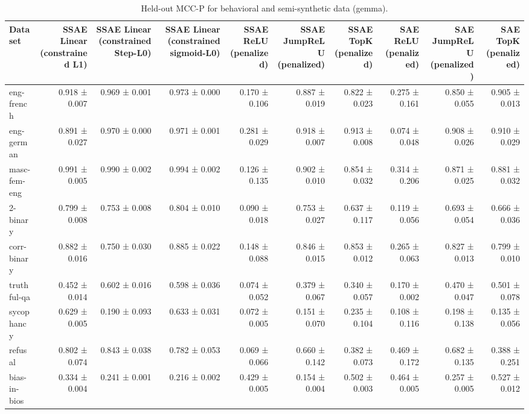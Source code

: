 \begin{table}[t]
\centering
\caption{Held-out MCC-P for behavioral and semi-synthetic data (gemma).}
\label{tab:all-datasets-gemma-mcc-p}
\begin{tabular}{lrrrrrrrrr}
\toprule
Dataset & SSAE Linear (constrained L1) & SSAE Linear (constrained Step-L0) & SSAE Linear (constrained sigmoid-L0) & SSAE ReLU (penalized) & SSAE JumpReLU (penalized) & SSAE TopK (penalized) & SAE ReLU (penalized) & SAE JumpReLU (penalized) & SAE TopK (penalized) \\
\midrule
eng-french & 0.918 ± 0.007 & 0.969 ± 0.001 & 0.973 ± 0.000 & 0.170 ± 0.106 & 0.887 ± 0.019 & 0.822 ± 0.023 & 0.275 ± 0.161 & 0.850 ± 0.055 & 0.905 ± 0.013 \\
eng-german & 0.891 ± 0.027 & 0.970 ± 0.000 & 0.971 ± 0.001 & 0.281 ± 0.029 & 0.918 ± 0.007 & 0.913 ± 0.008 & 0.074 ± 0.048 & 0.908 ± 0.026 & 0.910 ± 0.029 \\
masc-fem-eng & 0.991 ± 0.005 & 0.990 ± 0.002 & 0.994 ± 0.002 & 0.126 ± 0.135 & 0.902 ± 0.010 & 0.854 ± 0.032 & 0.314 ± 0.206 & 0.871 ± 0.025 & 0.881 ± 0.032 \\
2-binary & 0.799 ± 0.008 & 0.753 ± 0.008 & 0.804 ± 0.010 & 0.090 ± 0.018 & 0.753 ± 0.027 & 0.637 ± 0.117 & 0.119 ± 0.056 & 0.693 ± 0.054 & 0.666 ± 0.036 \\
corr-binary & 0.882 ± 0.016 & 0.750 ± 0.030 & 0.885 ± 0.022 & 0.148 ± 0.088 & 0.846 ± 0.015 & 0.853 ± 0.012 & 0.265 ± 0.063 & 0.827 ± 0.013 & 0.799 ± 0.010 \\
truthful-qa & 0.452 ± 0.014 & 0.602 ± 0.016 & 0.598 ± 0.036 & 0.074 ± 0.052 & 0.379 ± 0.067 & 0.340 ± 0.057 & 0.170 ± 0.002 & 0.470 ± 0.047 & 0.501 ± 0.078 \\
sycophancy & 0.629 ± 0.005 & 0.190 ± 0.093 & 0.633 ± 0.031 & 0.072 ± 0.005 & 0.151 ± 0.070 & 0.235 ± 0.104 & 0.108 ± 0.116 & 0.198 ± 0.138 & 0.135 ± 0.056 \\
refusal & 0.802 ± 0.074 & 0.843 ± 0.038 & 0.782 ± 0.053 & 0.069 ± 0.066 & 0.660 ± 0.142 & 0.382 ± 0.073 & 0.469 ± 0.172 & 0.682 ± 0.135 & 0.388 ± 0.251 \\
bias-in-bios & 0.334 ± 0.004 & 0.241 ± 0.001 & 0.216 ± 0.002 & 0.429 ± 0.005 & 0.154 ± 0.004 & 0.502 ± 0.003 & 0.464 ± 0.005 & 0.257 ± 0.005 & 0.527 ± 0.012 \\
\bottomrule
\end{tabular}
\end{table}
